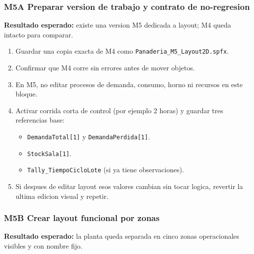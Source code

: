 \documentclass[11pt]{article}
\newcommand{\simio}[1]{\texttt{#1}}
\newcommand{\state}[1]{\texttt{#1}}
\begin{document}
\subsubsection{M5A Preparar version de trabajo y contrato de no-regresion}
\textbf{Resultado esperado:} existe una version M5 dedicada a layout; M4 queda intacto para comparar.

\begin{enumerate}
  \item Guardar una copia exacta de M4 como \simio{Panaderia\_M5\_Layout2D.spfx}.
  \item Confirmar que M4 corre sin errores antes de mover objetos.
  \item En M5, no editar procesos de demanda, consumo, horno ni recursos en este bloque.
  \item Activar corrida corta de control (por ejemplo 2 horas) y guardar tres referencias base:
  \begin{itemize}
    \item \state{DemandaTotal[1]} y \state{DemandaPerdida[1]}.
    \item \state{StockSala[1]}.
    \item \simio{Tally\_TiempoCicloLote} (si ya tiene observaciones).
  \end{itemize}
  \item Si despues de editar layout esos valores cambian sin tocar logica, revertir la ultima edicion visual y repetir.
\end{enumerate}

\subsubsection{M5B Crear layout funcional por zonas}
\textbf{Resultado esperado:} la planta queda separada en cinco zonas operacionales visibles y con nombre fijo.
\end{document}
